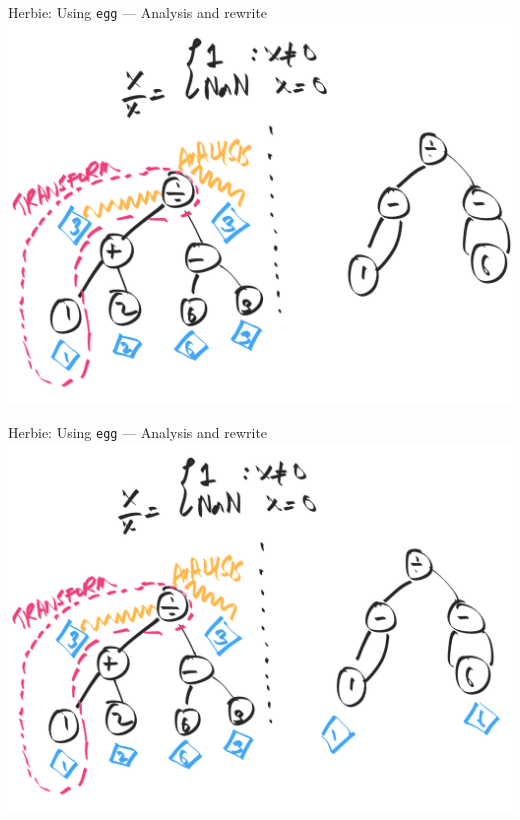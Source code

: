 \documentclass[8pt]{beamer}
\newcommand{\egg}{\texttt{egg} }
\begin{document}
\begin{frame}[fragile]{Herbie: Using \egg --- Analysis and rewrite}
\includegraphics[width=\textwidth]{./rewrite-4.png}
\end{frame}


\begin{frame}[fragile]{Herbie: Using \egg --- Analysis and rewrite}
\includegraphics[width=\textwidth]{./rewrite-5.png}
\end{frame}
\end{document}
